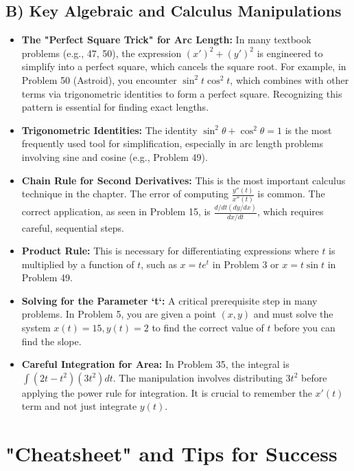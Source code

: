 \documentclass{article}
\begin{document}
\subsection{B) Key Algebraic and Calculus Manipulations}
\begin{itemize}
    \item \textbf{The "Perfect Square Trick" for Arc Length:} In many textbook problems (e.g., 47, 50), the expression $(x')^2 + (y')^2$ is engineered to simplify into a perfect square, which cancels the square root. For example, in Problem 50 (Astroid), you encounter $\sin^2 t \cos^2 t$, which combines with other terms via trigonometric identities to form a perfect square. Recognizing this pattern is essential for finding exact lengths.
    \item \textbf{Trigonometric Identities:} The identity $\sin^2\theta + \cos^2\theta = 1$ is the most frequently used tool for simplification, especially in arc length problems involving sine and cosine (e.g., Problem 49).
    \item \textbf{Chain Rule for Second Derivatives:} This is the most important calculus technique in the chapter. The error of computing $\frac{y''(t)}{x''(t)}$ is common. The correct application, as seen in Problem 15, is $\frac{d/dt(dy/dx)}{dx/dt}$, which requires careful, sequential steps.
    \item \textbf{Product Rule:} This is necessary for differentiating expressions where $t$ is multiplied by a function of $t$, such as $x = te^t$ in Problem 3 or $x=t\sin t$ in Problem 49.
    \item \textbf{Solving for the Parameter `t`:} A critical prerequisite step in many problems. In Problem 5, you are given a point $(x,y)$ and must solve the system $x(t)=15, y(t)=2$ to find the correct value of $t$ before you can find the slope.
    \item \textbf{Careful Integration for Area:} In Problem 35, the integral is $\int (2t-t^2)(3t^2)dt$. The manipulation involves distributing $3t^2$ before applying the power rule for integration. It is crucial to remember the $x'(t)$ term and not just integrate $y(t)$.
\end{itemize}

\newpage
\section{"Cheatsheet" and Tips for Success}
\end{document}
